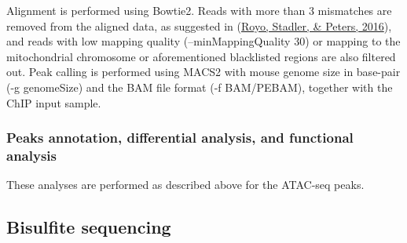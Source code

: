\documentclass[12pt,twoside]{reedthesis}
\begin{document}
Alignment is performed using Bowtie2. Reads with more than 3 mismatches
are removed from the aligned data, as suggested in (\protect\hyperlink{ref-royo2016}{Royo, Stadler, \& Peters, 2016}), and
reads with low mapping quality (--minMappingQuality 30) or mapping to
the mitochondrial chromosome or aforementioned blacklisted regions are
also filtered out. Peak calling is performed using MACS2 with mouse
genome size in base-pair (-g genomeSize) and the BAM file format (-f
BAM/PEBAM), together with the ChIP input sample.

\hypertarget{m3.4.2}{%
\subsubsection*{Peaks annotation, differential analysis, and functional analysis}\label{m3.4.2}}

These analyses are performed as described above for the ATAC-seq peaks.

\hypertarget{m3.5}{%
\subsection*{Bisulfite sequencing}\label{m3.5}}
\end{document}
